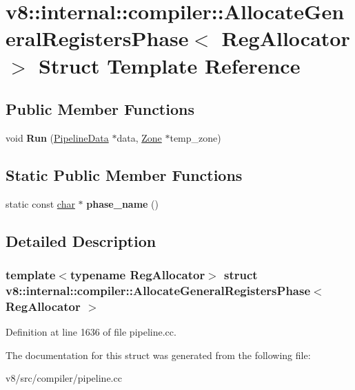 \hypertarget{structv8_1_1internal_1_1compiler_1_1AllocateGeneralRegistersPhase}{}\section{v8\+:\+:internal\+:\+:compiler\+:\+:Allocate\+General\+Registers\+Phase$<$ Reg\+Allocator $>$ Struct Template Reference}
\label{structv8_1_1internal_1_1compiler_1_1AllocateGeneralRegistersPhase}
\subsection*{Public Member Functions}
\begin{DoxyCompactItemize}
\item 
\mbox{\label{structv8_1_1internal_1_1compiler_1_1AllocateGeneralRegistersPhase_a55c00393389c82edb2c9a5bd71e19465}} 
void {\bfseries Run} (\mbox{\hyperlink{classv8_1_1internal_1_1compiler_1_1PipelineData}{Pipeline\+Data}} $\ast$data, \mbox{\hyperlink{classv8_1_1internal_1_1Zone}{Zone}} $\ast$temp\+\_\+zone)
\end{DoxyCompactItemize}
\subsection*{Static Public Member Functions}
\begin{DoxyCompactItemize}
\item 
\mbox{\label{structv8_1_1internal_1_1compiler_1_1AllocateGeneralRegistersPhase_a1e84383afb21659a68d7ee495ff46edd}} 
static const \mbox{\hyperlink{classchar}{char}} $\ast$ {\bfseries phase\+\_\+name} ()
\end{DoxyCompactItemize}


\subsection{Detailed Description}
\subsubsection*{template$<$typename Reg\+Allocator$>$\newline
struct v8\+::internal\+::compiler\+::\+Allocate\+General\+Registers\+Phase$<$ Reg\+Allocator $>$}



Definition at line 1636 of file pipeline.\+cc.



The documentation for this struct was generated from the following file\+:\begin{DoxyCompactItemize}
\item 
v8/src/compiler/pipeline.\+cc\end{DoxyCompactItemize}
